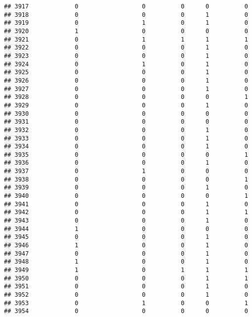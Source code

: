 \documentclass[
]{article}
\begin{document}
\begin{verbatim}
## 3917             0                  0          0      0          0
## 3918             0                  0          0      1          0
## 3919             0                  1          0      1          0
## 3920             1                  0          0      0          0
## 3921             0                  1          1      1          1
## 3922             0                  0          0      1          0
## 3923             0                  0          0      1          0
## 3924             0                  1          0      1          0
## 3925             0                  0          0      1          0
## 3926             0                  0          0      1          0
## 3927             0                  0          0      1          0
## 3928             0                  0          0      0          1
## 3929             0                  0          0      1          0
## 3930             0                  0          0      0          0
## 3931             0                  0          0      0          0
## 3932             0                  0          0      1          0
## 3933             0                  0          0      1          0
## 3934             0                  0          0      1          0
## 3935             0                  0          0      0          1
## 3936             0                  0          0      1          0
## 3937             0                  1          0      0          0
## 3938             0                  0          0      0          1
## 3939             0                  0          0      1          0
## 3940             0                  0          0      0          1
## 3941             0                  0          0      1          0
## 3942             0                  0          0      1          1
## 3943             0                  0          0      1          0
## 3944             1                  0          0      0          0
## 3945             0                  0          0      1          0
## 3946             1                  0          0      1          0
## 3947             0                  0          0      1          0
## 3948             1                  0          0      1          0
## 3949             1                  0          1      1          1
## 3950             0                  0          0      1          1
## 3951             0                  0          0      1          0
## 3952             0                  0          0      1          0
## 3953             0                  1          0      0          1
## 3954             0                  0          0      0          0

\end{verbatim}
\end{document}
